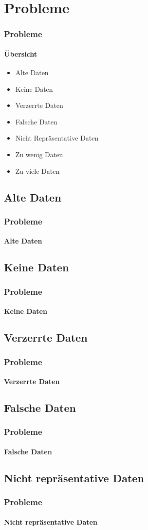 \section{Probleme}
\begin{frame}
\frametitle{Probleme}
\framesubtitle{Übersicht}
\begin{itemize}
\item Alte Daten
\item Keine Daten
\item Verzerrte Daten
\item Falsche Daten
\item Nicht Repräsentative Daten
\item Zu wenig Daten
\item Zu viele Daten
\end{itemize}
\end{frame}


\subsection{Alte Daten}
\begin{frame}
\frametitle{Probleme}
\framesubtitle{Alte Daten}
\end{frame}

\subsection{Keine Daten}
\begin{frame}
\frametitle{Probleme}
\framesubtitle{Keine Daten}
\end{frame}


\subsection{Verzerrte Daten}
\begin{frame}
\frametitle{Probleme}
\framesubtitle{Verzerrte Daten}
\end{frame}

\subsection{Falsche Daten}
\begin{frame}
\frametitle{Probleme}
\framesubtitle{Falsche Daten}
\end{frame}

\subsection{Nicht repräsentative Daten}
\begin{frame}
\frametitle{Probleme}
\framesubtitle{Nicht repräsentative Daten}
\end{frame}

